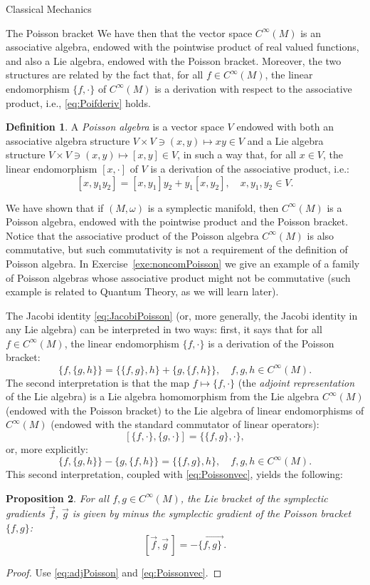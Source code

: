 \documentclass[oneside,a4paper,11pt]{amsbook}
\theoremstyle{remark}\newtheorem{exercise}{Exercise}[chapter]
\theoremstyle{plain}\newtheorem{teo}{Theorem}[section]
\theoremstyle{plain}\newtheorem{lem}[teo]{Lemma}
\theoremstyle{plain}\newtheorem{prop}[teo]{Proposition}
\theoremstyle{plain}\newtheorem{cor}[teo]{Corollary}
\theoremstyle{definition}\newtheorem{defin}[teo]{Definition}
\theoremstyle{remark}\newtheorem{rem}[teo]{Remark}
\theoremstyle{definition}\newtheorem{notation}[teo]{Notation}
\theoremstyle{definition}\newtheorem{convention}[teo]{Convention}
\theoremstyle{definition}\newtheorem{example}[teo]{Example}
\numberwithin{section}{chapter}
\numberwithin{equation}{section}
\begin{document}
\begin{chapter}{Classical Mechanics}
\begin{section}{The Poisson bracket}
We have then that the vector space $C^\infty(M)$ is an associative algebra, endowed with the pointwise product of real valued functions, and
also a Lie algebra, endowed with the Poisson bracket. Moreover, the two structures are related by the fact that, for all $f\in C^\infty(M)$, the linear
endomorphism $\{f,\cdot\}$ of $C^\infty(M)$ is a derivation with respect to the associative product, i.e., \eqref{eq:Poifderiv} holds.

\begin{defin}
A {\em Poisson algebra\/} is a vector space $V$ endowed with both an associative algebra structure
$V\times V\ni(x,y)\mapsto xy\in V$ and a Lie algebra structure
$V\times V\ni(x,y)\mapsto[x,y]\in V$, in such a way that, for all $x\in V$, the linear endomorphism $[x,\cdot]$ of $V$ is a derivation of the associative product,
i.e.:
\[[x,y_1y_2]=[x,y_1]y_2+y_1[x,y_2],\quad x,y_1,y_2\in V.\]
\end{defin}
We have shown that if $(M,\omega)$ is a symplectic manifold, then $C^\infty(M)$ is a Poisson algebra, endowed with the pointwise product and the Poisson bracket.
Notice that the associative product of the Poisson algebra $C^\infty(M)$ is also commutative, but such commutativity is not a requirement of the definition of Poisson algebra.
In Exercise~\ref{exe:noncomPoisson} we give an example of a family of Poisson algebras whose associative product might not
be commutative (such example is related to Quantum Theory, as we will learn later).

\medskip

The Jacobi identity \eqref{eq:JacobiPoisson} (or, more generally, the Jacobi identity in any Lie algebra) can be interpreted in two ways: first, it says
that for all $f\in C^\infty(M)$, the linear endomorphism $\{f,\cdot\}$ is a derivation of the Poisson bracket:
\[\{f,\{g,h\}\}=\{\{f,g\},h\}+\{g,\{f,h\}\},\quad f,g,h\in C^\infty(M).\]
The second interpretation is that the map $f\mapsto\{f,\cdot\}$ (the {\em adjoint representation\/} of the Lie algebra) is a Lie algebra homomorphism
from the Lie algebra $C^\infty(M)$ (endowed with the Poisson bracket) to the Lie algebra of linear endomorphisms of $C^\infty(M)$ (endowed with the
standard commutator of linear operators):
\begin{equation}\label{eq:adjPoisson}
[\{f,\cdot\},\{g,\cdot\}]=\{\{f,g\},\cdot\},
\end{equation}
or, more explicitly:
\[\{f,\{g,h\}\}-\{g,\{f,h\}\}=\{\{f,g\},h\},\quad f,g,h\in C^\infty(M).\]
This second interpretation, coupled with \eqref{eq:Poissonvec}, yields the following:
\begin{prop}
For all $f,g\in C^\infty(M)$, the Lie bracket of the symplectic gradients $\vec f$, $\vec g$ is given by minus the symplectic gradient of the Poisson
bracket $\{f,g\}$:
\[[\vec f,\vec g\,]=-\overrightarrow{\{f,g\}\,}.\]
\end{prop}
\begin{proof}
Use \eqref{eq:adjPoisson} and \eqref{eq:Poissonvec}.
\end{proof}


\end{section}
\end{chapter}
\end{document}
